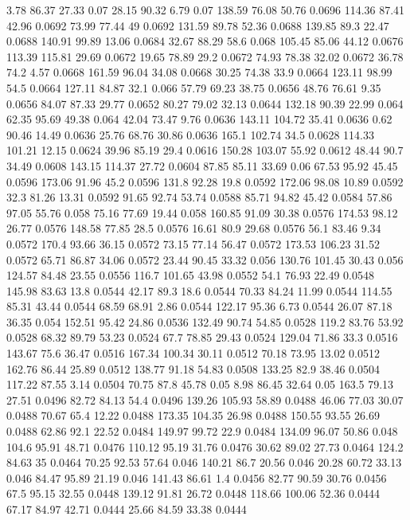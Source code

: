 3.78	86.37	27.33	0.07
28.15	90.32	6.79	0.07
138.59	76.08	50.76	0.0696
114.36	87.41	42.96	0.0692
73.99	77.44	49	0.0692
131.59	89.78	52.36	0.0688
139.85	89.3	22.47	0.0688
140.91	99.89	13.06	0.0684
32.67	88.29	58.6	0.068
105.45	85.06	44.12	0.0676
113.39	115.81	29.69	0.0672
19.65	78.89	29.2	0.0672
74.93	78.38	32.02	0.0672
36.78	74.2	4.57	0.0668
161.59	96.04	34.08	0.0668
30.25	74.38	33.9	0.0664
123.11	98.99	54.5	0.0664
127.11	84.87	32.1	0.066
57.79	69.23	38.75	0.0656
48.76	76.61	9.35	0.0656
84.07	87.33	29.77	0.0652
80.27	79.02	32.13	0.0644
132.18	90.39	22.99	0.064
62.35	95.69	49.38	0.064
42.04	73.47	9.76	0.0636
143.11	104.72	35.41	0.0636
0.62	90.46	14.49	0.0636
25.76	68.76	30.86	0.0636
165.1	102.74	34.5	0.0628
114.33	101.21	12.15	0.0624
39.96	85.19	29.4	0.0616
150.28	103.07	55.92	0.0612
48.44	90.7	34.49	0.0608
143.15	114.37	27.72	0.0604
87.85	85.11	33.69	0.06
67.53	95.92	45.45	0.0596
173.06	91.96	45.2	0.0596
131.8	92.28	19.8	0.0592
172.06	98.08	10.89	0.0592
32.3	81.26	13.31	0.0592
91.65	92.74	53.74	0.0588
85.71	94.82	45.42	0.0584
57.86	97.05	55.76	0.058
75.16	77.69	19.44	0.058
160.85	91.09	30.38	0.0576
174.53	98.12	26.77	0.0576
148.58	77.85	28.5	0.0576
16.61	80.9	29.68	0.0576
56.1	83.46	9.34	0.0572
170.4	93.66	36.15	0.0572
73.15	77.14	56.47	0.0572
173.53	106.23	31.52	0.0572
65.71	86.87	34.06	0.0572
23.44	90.45	33.32	0.056
130.76	101.45	30.43	0.056
124.57	84.48	23.55	0.0556
116.7	101.65	43.98	0.0552
54.1	76.93	22.49	0.0548
145.98	83.63	13.8	0.0544
42.17	89.3	18.6	0.0544
70.33	84.24	11.99	0.0544
114.55	85.31	43.44	0.0544
68.59	68.91	2.86	0.0544
122.17	95.36	6.73	0.0544
26.07	87.18	36.35	0.054
152.51	95.42	24.86	0.0536
132.49	90.74	54.85	0.0528
119.2	83.76	53.92	0.0528
68.32	89.79	53.23	0.0524
67.7	78.85	29.43	0.0524
129.04	71.86	33.3	0.0516
143.67	75.6	36.47	0.0516
167.34	100.34	30.11	0.0512
70.18	73.95	13.02	0.0512
162.76	86.44	25.89	0.0512
138.77	91.18	54.83	0.0508
133.25	82.9	38.46	0.0504
117.22	87.55	3.14	0.0504
70.75	87.8	45.78	0.05
8.98	86.45	32.64	0.05
163.5	79.13	27.51	0.0496
82.72	84.13	54.4	0.0496
139.26	105.93	58.89	0.0488
46.06	77.03	30.07	0.0488
70.67	65.4	12.22	0.0488
173.35	104.35	26.98	0.0488
150.55	93.55	26.69	0.0488
62.86	92.1	22.52	0.0484
149.97	99.72	22.9	0.0484
134.09	96.07	50.86	0.048
104.6	95.91	48.71	0.0476
110.12	95.19	31.76	0.0476
30.62	89.02	27.73	0.0464
124.2	84.63	35	0.0464
70.25	92.53	57.64	0.046
140.21	86.7	20.56	0.046
20.28	60.72	33.13	0.046
84.47	95.89	21.19	0.046
141.43	86.61	1.4	0.0456
82.77	90.59	30.76	0.0456
67.5	95.15	32.55	0.0448
139.12	91.81	26.72	0.0448
118.66	100.06	52.36	0.0444
67.17	84.97	42.71	0.0444
25.66	84.59	33.38	0.0444
